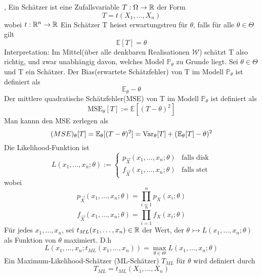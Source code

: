 \sep
\Def[1.1] \newline
Ein Schätzer ist eine Zufallsvariable \(T : \Omega \rightarrow \mathbb{R} \) der Form \[ T = t(X_1, \dots , X_n)\] wobei \(t : \mathbb{R}^n \rightarrow \mathbb{R}\) \newline
\Def[1.2] \newline
Ein Schätzer T heisst erwartungstreu für \( \theta \), falls für alle \( \theta \in \Theta\) gilt \[ \mathbb{E}[T] = \theta\]
\Bem[1.2A] \newline
Interpretation: Im Mittel(über alle denkbaren Realisationen \(\mathcal{W}\)) schätzt T also richtig, und zwar unabhängig davon, welches Model \(\mathbb{P}_\theta \) zu Grunde liegt.
\Def[1.3] Sei \(\theta \in \Theta \) und T ein Schätzer. Der Bias(erwartete Schätzfehler) von T im Modell \( \mathbb{P}_\theta\) ist definiert als \[ \mathbb{E}_\theta - \theta\]
Der mittlere quadratische Schätzfehler(MSE) von T im Modell \( \mathbb{P}_\theta\) ist definiert als \[\text{MSE}_\theta[T] := \mathbb{E}[(T - \theta)^2]\]
\Bem[1.3A] \newline
Man kannn den MSE zerlegen als \[ \text(MSE)_\theta[T] = \mathbb{E}_\theta[(T - \theta)^2] = \text{Var}_\theta[T] + (\mathbb{E}_\theta[T] - \theta)^2\]
\Def[1.4] \newline
Die Likelihood-Funktion ist \[L(x_1, \dots , x_n; \theta) := \left.
    \begin{cases}
    p_{\overrightarrow{X}}(x_1, \dots , x_n; \theta) & \text{falls disk} \\
    f_{\overrightarrow{X}}(x_1, \dots , x_n; \theta) & \text{falls stet}
\end{cases}
\right.\]
wobei 
\[p_{\overrightarrow{X}}(x_1, \dots , x_n; \theta) = \prod_{i=1}^n p_X(x_i;\theta)\]
\[f_{\overrightarrow{X}}(x_1, \dots , x_n; \theta) = \prod_{i=1}^n f_X(x_i;\theta)\]
\Def[1.5] \newline
Für jedes \(x_1, \dots , x_n\), sei \(t_{ML}(x_1, \dots, x_n) \in \mathbb{R}\) der Wert, der \(\theta \rightarrowtail L(x_1, \dots , x_n; \theta )\) als Funktion von \( \theta \) maximiert. D.h
\[L(x_1, \dots , x_n; t_{ML}(x_1, \dots , x_n)) = \max_{\theta \in \Theta} L(x_1, \dots , x_n; \theta)\]
Ein Maximum-Likelihood-Schätzer (ML-Schätzer) \(T_{ML}\) für \( \theta \) wird definiert durch \[ T_{ML} = t_{ML}(X_1, \dots , X_n)\]
